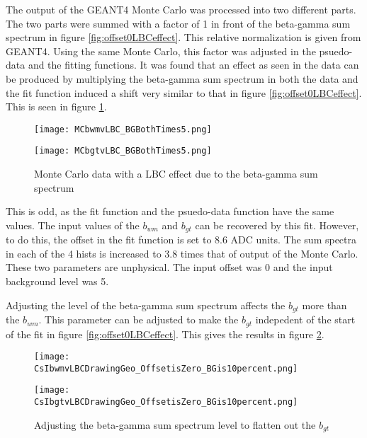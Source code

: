 \documentclass[main.tex]{subfiles}
\begin{document}
The output of the GEANT4 Monte Carlo was processed into two different parts.
The two parts were summed with a factor of 1 in front of the beta-gamma sum spectrum in figure \ref{fig:offset0LBCeffect}.
This relative normalization is given from GEANT4.
Using the same Monte Carlo, this factor was adjusted in the psuedo-data and the fitting functions.
It was found that an effect as seen in the data can be produced by multiplying the beta-gamma sum spectrum in both the data and the fit function induced a shift very similar to that in figure \ref{fig:offset0LBCeffect}.
This is seen in figure \ref{fig:MCTimes5}.    

\begin{figure}
    \centering
    \begin{minipage}{0.50\textwidth}
        \centerline{\texttt{[image: MCbwmvLBC\_BGBothTimes5.png]}}
    \end{minipage}\hfill
    \begin{minipage}{0.50\textwidth}
        \centerline{\texttt{[image: MCbgtvLBC\_BGBothTimes5.png]}}
    \end{minipage}
    \caption{Monte Carlo data with a LBC effect due to the beta-gamma sum spectrum}
    \label{fig:MCTimes5}
\end{figure}

This is odd, as the fit function and the psuedo-data function have the same values.
The input values of the $b_{wm}$ and $b_{gt}$ can be recovered by this fit.
However, to do this, the offset in the fit function is set to 8.6 ADC units.
The sum spectra in each of the 4 hists is increased to 3.8 times that of output of the Monte Carlo.
These two parameters are unphysical.
The input offset was 0 and the input background level was 5.

Adjusting the level of the beta-gamma sum spectrum affects the $b_{gt}$ more than the $b_{wm}$.
This parameter can be adjusted to make the $b_{gt}$ indepedent of the start of the fit in figure \ref{fig:offset0LBCeffect}. 
This gives the results in figure \ref{fig:dataoffset0BG10per}. 

\begin{figure}
    \centering
    \begin{minipage}{0.50\textwidth}
        \centerline{\texttt{[image: CsIbwmvLBCDrawingGeo\_OffsetisZero\_BGis10percent.png]}}
    \end{minipage}\hfill
    \begin{minipage}{0.50\textwidth}
        \centerline{\texttt{[image: CsIbgtvLBCDrawingGeo\_OffsetisZero\_BGis10percent.png]}}
    \end{minipage}
    \caption{Adjusting the beta-gamma sum spectrum level to flatten out the $b_{gt}$}
    \label{fig:dataoffset0BG10per}
\end{figure}
\end{document}

